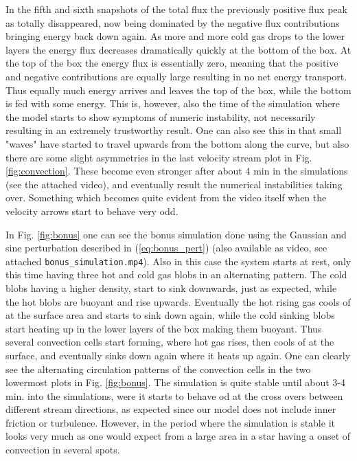 \documentclass{emulateapj}
\begin{document}
	In the fifth and sixth snapshots of the total flux the previously positive flux peak as totally disappeared, now being dominated by the negative flux contributions bringing energy back down again. As more and more cold gas drops to the lower layers the energy flux decreases dramatically quickly at the bottom of the box. At the top of the box the energy flux is essentially zero, meaning that the positive and negative contributions are equally large resulting in no net energy transport. Thus equally much energy arrives and leaves the top of the box, while the bottom is fed with some energy. This is, however, also the time of the simulation where the model starts to show symptoms of numeric instability, not necessarily resulting in an extremely trustworthy result. One can also see this in that small "waves" have started to travel upwards from the bottom along the curve, but also there are some slight asymmetries in the last velocity stream plot in Fig. \ref{fig:convection}. These become even stronger after about 4 min in the simulations (see the attached video), and eventually result the numerical instabilities taking over. Something which becomes quite evident from the video itself when the velocity arrows start to behave very odd. 
	
	In Fig. \ref{fig:bonus} one can see the bonus simulation done using the Gaussian and sine perturbation described in (\ref{eq:bonus_pert}) (also available as video, see attached \texttt{bonus\_simulation.mp4}). Also in this case the system starts at rest, only this time having three hot and cold gas blobs in an alternating pattern. The cold blobs having a higher density, start to sink downwards, just as expected, while the hot blobs are buoyant and rise upwards. Eventually the hot rising gas cools of at the surface area and starts to sink down again, while the cold sinking blobs start heating up in the lower layers of the box making them buoyant. Thus several convection cells start forming, where hot gas rises, then cools of at the surface, and eventually sinks down again where it heats up again. One can clearly see the alternating circulation patterns of the convection cells in the two lowermost plots in Fig. \ref{fig:bonus}. The simulation is quite stable until about 3-4 min. into the simulations, were it starts to behave od at the cross overs between different stream directions, as expected since our model does not include inner friction or turbulence. However, in the period where the simulation is stable it looks very much as one would expect from a large area in a star having a onset of convection in several spots.
	
\end{document}
